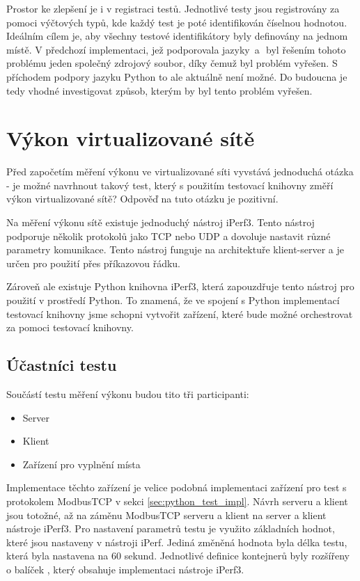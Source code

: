 Prostor ke zlepšení je i v registraci testů. Jednotlivé testy jsou registrovány za pomoci výčtových typů, kde každý test je poté identifikován číselnou hodnotou. Ideálním cílem je, aby všechny testové identifikátory byly definovány na jednom místě. V předchozí implementaci, jež podporovala jazyky \csharp\,a\,\cpp\, byl řešením tohoto problému jeden společný zdrojový soubor, díky čemuž byl problém vyřešen. S příchodem podpory jazyku Python to ale aktuálně není možné. Do budoucna je tedy vhodné investigovat způsob, kterým by byl tento problém vyřešen.

\section{Výkon virtualizované sítě}

Před započetím měření výkonu ve virtualizované síti vyvstává jednoduchá otázka - je možné navrhnout takový test, který s použitím testovací knihovny změří výkon virtualizované sítě? Odpověď na tuto otázku je pozitivní. 

Na měření výkonu sítě existuje jednoduchý nástroj iPerf3. Tento nástroj podporuje několik protokolů jako TCP nebo UDP a dovoluje nastavit různé parametry komunikace. Tento nástroj funguje na architektuře klient-server a je určen pro použití přes příkazovou řádku.

Zároveň ale existuje Python knihovna iPerf3, která zapouzdřuje tento nástroj pro použití v prostředí Python. To znamená, že ve spojení s Python implementací testovací knihovny jsme schopni vytvořit zařízení, které bude možné orchestrovat za pomoci testovací knihovny.

\subsection{Účastníci testu}

Součástí testu měření výkonu budou tito tři participanti:

\begin{itemize}
    \item Server
    \item Klient
    \item Zařízení pro vyplnění místa
\end{itemize}

Implementace těchto zařízení je velice podobná implementaci zařízení pro test s protokolem ModbusTCP v sekci \ref{sec:python_test_impl}. Návrh serveru a klient jsou totožné, až na záměnu ModbusTCP serveru a klient na server a klient nástroje iPerf3. Pro nastavení parametrů testu je využito základních hodnot, které jsou nastaveny v nástroji iPerf. Jediná změněná hodnota byla délka testu, která byla nastavena na 60 sekund. Jednotlivé definice kontejnerů byly rozšířeny o balíček , který obsahuje implementaci nástroje iPerf3. 

